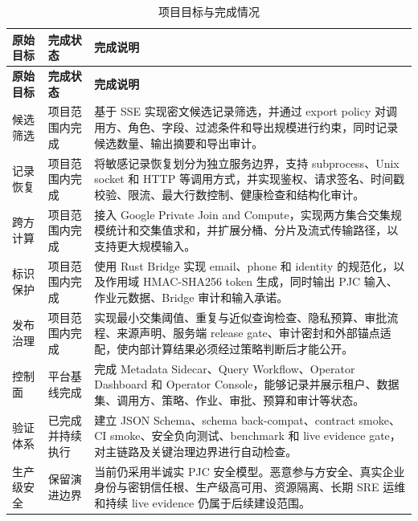 \documentclass[UTF8,a4paper,12pt,oneside]{ctexrep}
\begin{document}
\begin{longtable}{p{}p{}p{}}
\caption{项目目标与完成情况}\label{tab:goal-completion}\\
\toprule
\textbf{原始目标} & \textbf{完成状态} & \textbf{完成说明} \\
\midrule
\endfirsthead
\toprule
\textbf{原始目标} & \textbf{完成状态} & \textbf{完成说明} \\
\midrule
\endhead
\bottomrule
\endfoot

候选筛选 &
项目范围内完成 &
基于 SSE 实现密文候选记录筛选，并通过 export policy 对调用方、角色、字段、过滤条件和导出规模进行约束，同时记录候选数量、输出摘要和导出审计。 \\

记录恢复 &
项目范围内完成 &
将敏感记录恢复划分为独立服务边界，支持 subprocess、Unix socket 和 HTTP 等调用方式，并实现鉴权、请求签名、时间戳校验、限流、最大行数控制、健康检查和结构化审计。 \\

跨方计算 &
项目范围内完成 &
接入 Google Private Join and Compute，实现两方集合交集规模统计和交集值求和，并扩展分桶、分片及流式传输路径，以支持更大规模输入。 \\

标识保护 &
项目范围内完成 &
使用 Rust Bridge 实现 email、phone 和 identity 的规范化，以及作用域 HMAC-SHA256 token 生成，同时输出 PJC 输入、作业元数据、Bridge 审计和输入承诺。 \\

发布治理 &
项目范围内完成 &
实现最小交集阈值、重复与近似查询检查、隐私预算、审批流程、来源声明、服务端 release gate、审计密封和外部锚点适配，使内部计算结果必须经过策略判断后才能公开。 \\

控制面 &
平台基线完成 &
完成 Metadata Sidecar、Query Workflow、Operator Dashboard 和 Operator Console，能够记录并展示租户、数据集、调用方、策略、作业、审批、预算和审计等状态。 \\

验证体系 &
已完成并持续执行 &
建立 JSON Schema、schema back-compat、contract smoke、CI smoke、安全负向测试、benchmark 和 live evidence gate，对主链路及关键治理边界进行自动检查。 \\

生产级安全 &
保留演进边界 &
当前仍采用半诚实 PJC 安全模型。恶意参与方安全、真实企业身份与密钥信任根、生产级高可用、资源隔离、长期 SRE 运维和持续 live evidence 仍属于后续建设范围。 \\

\end{longtable}
\end{document}
